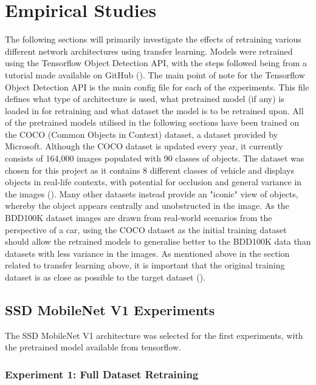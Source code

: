 \documentclass[12pt]{report}
\begin{document}
\chapter{Empirical Studies}
\begin{flushleft}
The following sections will primarily investigate the effects of retraining various different network architectures using transfer learning. Models were retrained using the Tensorflow Object Detection API, with the steps followed being from a tutorial made available on GitHub (\cite{tutorial}). The main point of note for the Tensorflow Object Detection API is the main config file for each of the experiments. This file defines what type of architecture is used, what pretrained model (if any) is loaded in for retraining and what dataset the model is to be retrained upon. All of the pretrained models utilised in the following sections have been trained on the COCO (Common Objects in Context) dataset, a dataset provided by Microsoft. Although the COCO dataset is updated every year, it currently consists of 164,000 images populated with 90 classes of objects. The dataset was chosen for this project as it contains 8 different classes of vehicle and displays objects in real-life contexts, with potential for occlusion and general variance in the images (\cite{lin2014microsoft}). Many other datasets instead provide an "iconic" view of objects, whereby the object appears centrally and unobstructed in the image. As the BDD100K dataset images are drawn from real-world scenarios from the perspective of a car, using the COCO dataset as the initial training dataset should allow the retrained models to generalise better to the BDD100K data than datasets with less variance in the images. As mentioned above in the section related to transfer learning above, it is important that the original training dataset is as close as possible to the target dataset (\cite{tan2018survey}).
\end{flushleft}

\section{SSD MobileNet V1 Experiments}
\begin{flushleft}
The SSD MobileNet V1 architecture was selected for the first experiments, with the pretrained model available from tensorflow.
\end{flushleft}

\subsection{Experiment 1: Full Dataset Retraining}
\end{document}

